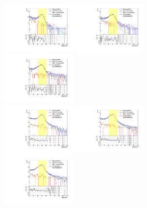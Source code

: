 \begin{figure}[htbp]
\includegraphics[width=0.33\textwidth]{bkg_subtraction_baseline_template_range_baseline_mll80_100_pt10_15_eta0_80_tag_trigger_matched.pdf}
\includegraphics[width=0.33\textwidth]{bkg_subtraction_baseline_template_range_baseline_mll80_100_pt10_15_eta80_137_tag_trigger_matched.pdf}
\includegraphics[width=0.33\textwidth]{bkg_subtraction_baseline_template_range_baseline_mll80_100_pt10_15_eta151_200_tag_trigger_matched.pdf}\\
\includegraphics[width=0.33\textwidth]{bkg_subtraction_baseline_template_range_baseline_mll80_100_pt15_20_eta0_80_tag_trigger_matched.pdf}
\includegraphics[width=0.33\textwidth]{bkg_subtraction_baseline_template_range_baseline_mll80_100_pt15_20_eta80_137_tag_trigger_matched.pdf}
\includegraphics[width=0.33\textwidth]{bkg_subtraction_baseline_template_range_baseline_mll80_100_pt15_20_eta151_200_tag_trigger_matched.pdf}

\end{figure}
